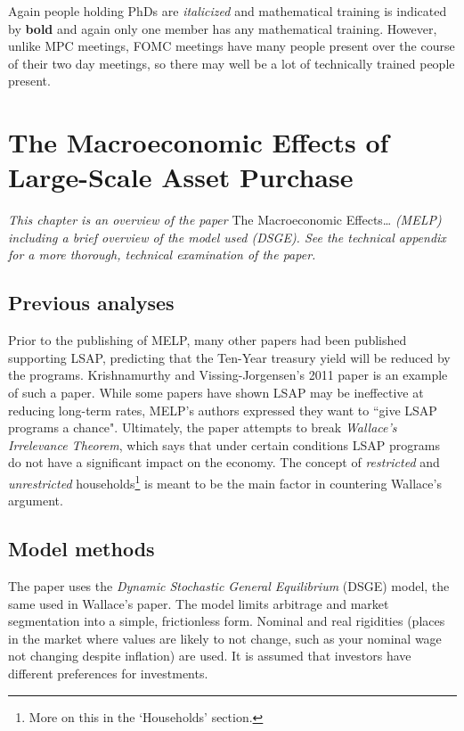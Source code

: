 \documentclass[notitlepage,12pt]{report}
\begin{document}
\hfill

Again people holding PhDs are {\it italicized} and mathematical training is indicated by {\bf bold} and again only one member has any mathematical training. However, unlike MPC meetings, FOMC meetings have many people present over the course of their two day meetings, so there may well be a lot of technically trained people present.

\chapter{The Macroeconomic Effects of Large-Scale Asset Purchase}

{\it This chapter is an overview of the paper} The Macroeconomic Effects\dots\cite{chen_macroeconomic_2011} {\it (MELP) including a brief overview of the model used (DSGE). See the technical appendix for a more thorough, technical examination of the paper.}

\section{Previous analyses}

Prior to the publishing of MELP, many other papers had been published supporting LSAP, predicting that the Ten-Year treasury yield will be reduced by the programs. Krishnamurthy and Vissing-Jorgensen's 2011 paper\cite{krishnamurthy_effects_2011} is an example of such a paper. While some papers have shown LSAP may be ineffective at reducing long-term rates, MELP's authors expressed they want to ``give LSAP programs a chance".\cite[p.2]{chen_macroeconomic_2011} Ultimately, the paper attempts to break {\it Wallace's Irrelevance Theorem}\cite{wallace_modigliani-miller_1981}, which says that under certain conditions LSAP programs do not have a significant impact on the economy. The concept of {\it restricted} and {\it unrestricted} households\footnote{More on this in the `Households' section.} is meant to be the main factor in countering Wallace's argument.

\section{Model methods}

The paper uses the {\it Dynamic Stochastic General Equilibrium} (DSGE) model, the same used in Wallace's paper.\cite{wallace_modigliani-miller_1981} The model limits arbitrage and market segmentation into a simple, frictionless form. Nominal and real rigidities (places in the market where values are likely to not change, such as your nominal wage not changing despite inflation) are used. It is assumed that investors have different preferences for investments.
\end{document}
